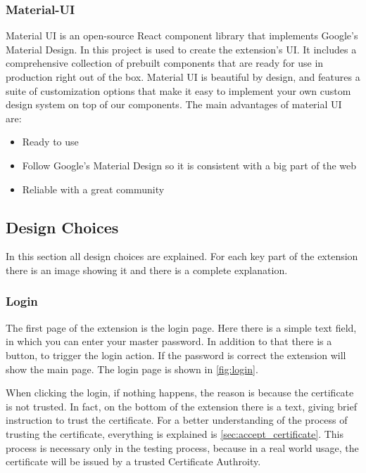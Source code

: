 \subsubsection {Material-UI}

Material UI is an open-source React component library that implements Google's Material Design. In this project is used to create the extension's UI.
It includes a comprehensive collection of prebuilt components that are ready for use in production right out of the box.
Material UI is beautiful by design, and features a suite of customization options that make it easy to implement your own custom design system on top of our components.
The main advantages of material UI are:

\begin{itemize}
    \item Ready to use
    \item Follow Google's Material Design so it is consistent with a big part of the web
    \item Reliable with a great community
\end{itemize}


\subsection {Design Choices}

In this section all design choices are explained. For each key part of the extension there is an image showing it and there is a complete explanation.

\subsubsection{Login}

The first page of the extension is the login page. Here there is a simple text field, in which you can enter your master password. In addition to that there is a button, to trigger the login action. If the password is correct the extension will show the main page.
The login page is shown in \autoref{fig:login}.

When clicking the login, if nothing happens, the reason is because the certificate is not trusted. In fact, on the bottom of the extension there is a text, giving brief instruction to trust the certificate. 
For a better understanding of the process of trusting the certificate, everything is explained is \autoref{sec:accept_certificate}.
This process is necessary only in the testing process, because in a real world usage, the certificate will be issued by a trusted Certificate Authroity.



